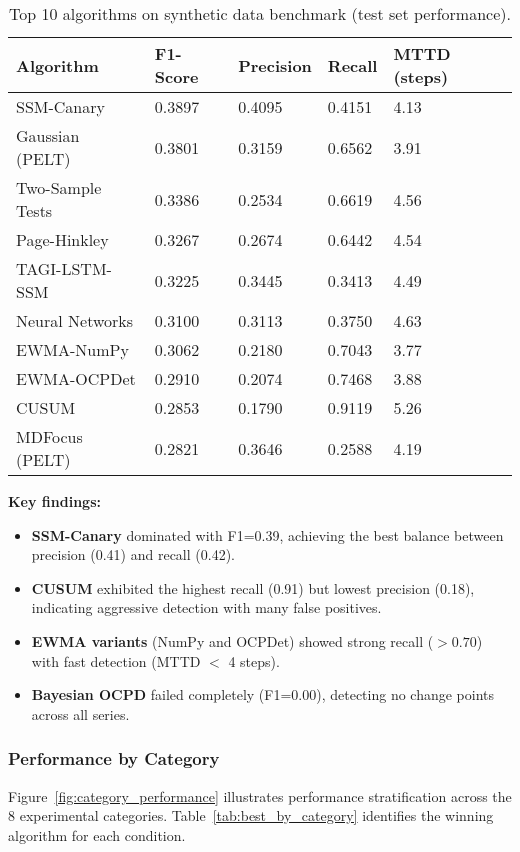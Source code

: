 \begin{table}[H]
\caption{Top 10 algorithms on synthetic data benchmark (test set performance).\label{tab:ranking_synthetic}}
\begin{tabularx}{\textwidth}{lXXXX}
\toprule
\textbf{Algorithm} & \textbf{F1-Score} & \textbf{Precision} & \textbf{Recall} & \textbf{MTTD (steps)} \\
\midrule
SSM-Canary & 0.3897 & 0.4095 & 0.4151 & 4.13 \\
Gaussian (PELT) & 0.3801 & 0.3159 & 0.6562 & 3.91 \\
Two-Sample Tests & 0.3386 & 0.2534 & 0.6619 & 4.56 \\
Page-Hinkley & 0.3267 & 0.2674 & 0.6442 & 4.54 \\
TAGI-LSTM-SSM & 0.3225 & 0.3445 & 0.3413 & 4.49 \\
Neural Networks & 0.3100 & 0.3113 & 0.3750 & 4.63 \\
EWMA-NumPy & 0.3062 & 0.2180 & 0.7043 & 3.77 \\
EWMA-OCPDet & 0.2910 & 0.2074 & 0.7468 & 3.88 \\
CUSUM & 0.2853 & 0.1790 & 0.9119 & 5.26 \\
MDFocus (PELT) & 0.2821 & 0.3646 & 0.2588 & 4.19 \\
\bottomrule
\end{tabularx}
\end{table}

\textbf{Key findings:}
\begin{itemize}
    \item \textbf{SSM-Canary} dominated with F1=0.39, achieving the best balance between precision (0.41) and recall (0.42).
    \item \textbf{CUSUM} exhibited the highest recall (0.91) but lowest precision (0.18), indicating aggressive detection with many false positives.
    \item \textbf{EWMA variants} (NumPy and OCPDet) showed strong recall ($>0.70$) with fast detection (MTTD $<$ 4 steps).
    \item \textbf{Bayesian OCPD} failed completely (F1=0.00), detecting no change points across all series.
\end{itemize}

\subsubsection{Performance by Category}

Figure~\ref{fig:category_performance} illustrates performance stratification across the 8 experimental categories. Table~\ref{tab:best_by_category} identifies the winning algorithm for each condition.

